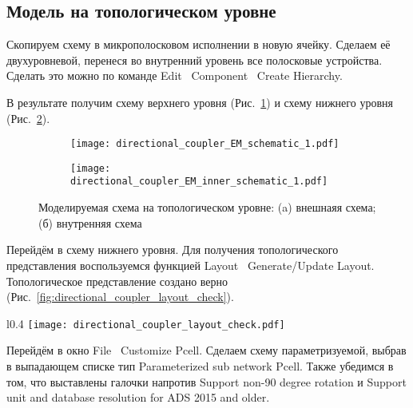 \subsection{Модель на топологическом уровне}

Скопируем схему в микрополосковом исполнении в новую ячейку. Сделаем её двухуровневой, перенеся во внутренний уровень все полосковые устройства. Сделать это можно по команде Edit \textrightarrow\ Component \textrightarrow\ Create Hierarchy.

В результате получим схему верхнего уровня (Рис.~\ref{fig:directional_coupler_EM_schematic}) и схему нижнего уровня (Рис.~\ref{fig:directional_coupler_EM_inner_schematic}).

\begin{figure}[!ht]
    \centering
    \begin{subfigure}[b]{0.45\textwidth}
        \centering
        \texttt{[image: directional\_coupler\_EM\_schematic\_1.pdf]}
        \caption{}%
    \label{fig:directional_coupler_EM_schematic}
    \end{subfigure}
    \hfill
    \begin{subfigure}[b]{0.45\textwidth}
        \centering
        \texttt{[image: directional\_coupler\_EM\_inner\_schematic\_1.pdf]}
        \caption{}%
    \label{fig:directional_coupler_EM_inner_schematic}
    \end{subfigure}
    \caption{%
        Моделируемая схема на топологическом уровне:
        (a) внешнаяя схема;
        (б) внутренняя схема
    }%
    \label{fig:directional_coupler_EM_schematics}
\end{figure}

Перейдём в схему нижнего уровня. Для получения топологического представления воспользуемся функцией Layout \textrightarrow\ Generate/Update Layout.
Топологическое представление создано верно (Рис.~\ref{fig:directional_coupler_layout_check}).

\begin{wrapfigure}{l}{0.4\textwidth}
    \centering
    \texttt{[image: directional\_coupler\_layout\_check.pdf]}
    \caption{Проверка топологического представления}%
    \label{fig:directional_coupler_layout_check}
\end{wrapfigure}

Перейдём в окно File \textrightarrow\ Customize Pcell.
Сделаем схему параметризуемой, выбрав в выпадающем списке тип Parameterized sub network Pcell.
Также убедимся в том, что выставлены галочки напротив Support non-90 degree rotation и Support unit and database resolution for ADS 2015 and older.

